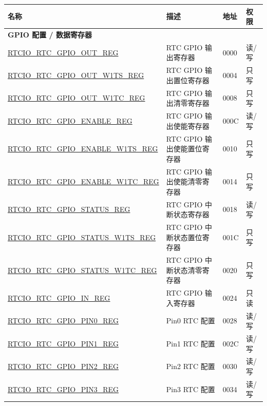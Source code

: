 ﻿\begin{longtable}{ | p{6.2cm} | p{7cm} | p{1.3cm} | p{1cm} | }
\hline\rowcolor{lightgray}
名称 & 描述 & 地址 & 权限 \\ \hline
\endhead
\multicolumn{4}{|l|}{\textbf{GPIO 配置 / 数据寄存器}} \\ \hline
\hyperref[regdesc:RTCIORTCGPIOOUTREG]{RTCIO\_RTC\_GPIO\_OUT\_REG} & RTC GPIO 输出寄存器 & \hexprefix{}0000 & 读/写 \\ \hline
\hyperref[regdesc:RTCIORTCGPIOOUTW1TSREG]{RTCIO\_RTC\_GPIO\_OUT\_W1TS\_REG} & RTC GPIO 输出置位寄存器 & \hexprefix{}0004 & 只写 \\ \hline
\hyperref[regdesc:RTCIORTCGPIOOUTW1TCREG]{RTCIO\_RTC\_GPIO\_OUT\_W1TC\_REG} & RTC GPIO 输出清零寄存器 & \hexprefix{}0008 & 只写 \\ \hline
\hyperref[regdesc:RTCIORTCGPIOENABLEREG]{RTCIO\_RTC\_GPIO\_ENABLE\_REG} & RTC GPIO 输出使能寄存器 & \hexprefix{}000C & 读/写 \\ \hline
\hyperref[regdesc:RTCIORTCGPIOENABLEW1TSREG]{RTCIO\_RTC\_GPIO\_ENABLE\_W1TS\_REG} & RTC GPIO 输出使能置位寄存器 & \hexprefix{}0010 & 只写 \\ \hline
\hyperref[regdesc:RTCIORTCGPIOENABLEW1TCREG]{RTCIO\_RTC\_GPIO\_ENABLE\_W1TC\_REG} & RTC GPIO 输出使能清零寄存器 & \hexprefix{}0014 & 只写 \\ \hline
\hyperref[regdesc:RTCIORTCGPIOSTATUSREG]{RTCIO\_RTC\_GPIO\_STATUS\_REG} & RTC GPIO 中断状态寄存器 & \hexprefix{}0018 & 读/写 \\ \hline
\hyperref[regdesc:RTCIORTCGPIOSTATUSW1TSREG]{RTCIO\_RTC\_GPIO\_STATUS\_W1TS\_REG} & RTC GPIO 中断状态置位寄存器 & \hexprefix{}001C & 只写 \\ \hline
\hyperref[regdesc:RTCIORTCGPIOSTATUSW1TCREG]{RTCIO\_RTC\_GPIO\_STATUS\_W1TC\_REG} & RTC GPIO 中断状态清零寄存器 & \hexprefix{}0020 & 只写 \\ \hline
\hyperref[regdesc:RTCIORTCGPIOINREG]{RTCIO\_RTC\_GPIO\_IN\_REG} & RTC GPIO 输入寄存器 & \hexprefix{}0024 & 只读 \\ \hline
\hyperref[regdesc:RTCIORTCGPIOPINNREG]{RTCIO\_RTC\_GPIO\_PIN0\_REG} & Pin0 RTC 配置 & \hexprefix{}0028 & 读/写 \\ \hline
\hyperref[regdesc:RTCIORTCGPIOPINNREG]{RTCIO\_RTC\_GPIO\_PIN1\_REG} & Pin1 RTC 配置 & \hexprefix{}002C & 读/写 \\ \hline
\hyperref[regdesc:RTCIORTCGPIOPINNREG]{RTCIO\_RTC\_GPIO\_PIN2\_REG} & Pin2 RTC 配置 & \hexprefix{}0030 & 读/写 \\ \hline
\hyperref[regdesc:RTCIORTCGPIOPINNREG]{RTCIO\_RTC\_GPIO\_PIN3\_REG} & Pin3 RTC 配置 & \hexprefix{}0034 & 读/写 \\ \hline

\end{longtable}
